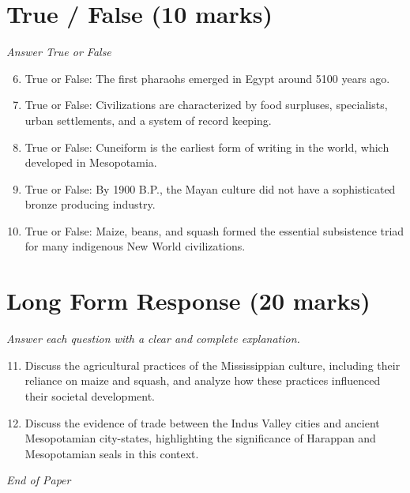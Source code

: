 \documentclass[12pt]{article}
\begin{document}
\section*{True / False (10 marks)}
\textit{Answer True or False}
\begin{enumerate}[label=\arabic*.]
\setcounter{enumi}{5}
\item True or False: The first pharaohs emerged in Egypt around 5100 years ago.
\item True or False: Civilizations are characterized by food surpluses, specialists, urban settlements, and a system of record keeping.
\item True or False: Cuneiform is the earliest form of writing in the world, which developed in Mesopotamia.
\item True or False: By 1900 B.P., the Mayan culture did not have a sophisticated bronze producing industry.
\item True or False: Maize, beans, and squash formed the essential subsistence triad for many indigenous New World civilizations.
\end{enumerate}

\section*{Long Form Response (20 marks)}
\textit{Answer each question with a clear and complete explanation.}
\begin{enumerate}[label=\arabic*.]
\setcounter{enumi}{10}
\item Discuss the agricultural practices of the Mississippian culture, including their reliance on maize and squash, and analyze how these practices influenced their societal development.
\item Discuss the evidence of trade between the Indus Valley cities and ancient Mesopotamian city-states, highlighting the significance of Harappan and Mesopotamian seals in this context.
\end{enumerate}

\vfill
\noindent\textit{End of Paper}
\end{document}
